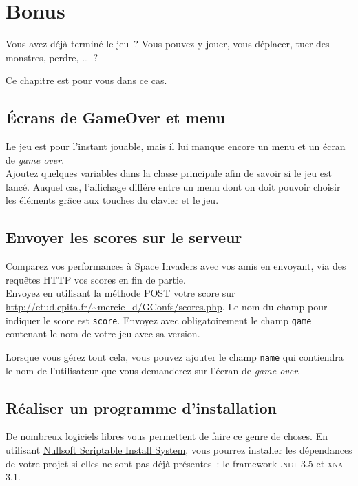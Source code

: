 \chapter{Bonus}

Vous avez déjà terminé le jeu~? Vous pouvez y jouer, vous déplacer, tuer des monstres, perdre, \ldots~?

Ce chapitre est pour vous dans ce cas.

\section{Écrans de GameOver et menu}

Le jeu est pour l'instant jouable, mais il lui manque encore un menu et un écran de \emph{game over}.\\

Ajoutez quelques variables dans la classe principale afin de savoir si le jeu est lancé. Auquel cas, l'affichage différe entre un menu dont on doit pouvoir choisir les éléments grâce aux touches du clavier et le jeu.


\section{Envoyer les scores sur le serveur}

Comparez vos performances à Space Invaders avec vos amis en envoyant, via des requêtes HTTP vos scores en fin de partie.\\

Envoyez en utilisant la méthode POST votre score sur \url{http://etud.epita.fr/~mercie_d/GConfs/scores.php}. Le nom du champ pour indiquer le score est \texttt{score}. Envoyez avec obligatoirement le champ \texttt{game} contenant le nom de votre jeu avec sa version.

Lorsque vous gérez tout cela, vous pouvez ajouter le champ \texttt{name} qui contiendra le nom de l'utilisateur que vous demanderez sur l'écran de \emph{game over}.


\section{Réaliser un programme d'installation}

De nombreux logiciels libres vous permettent de faire ce genre de choses. En utilisant \href{http://nsis.sourceforge.net/}{Nullsoft Scriptable Install System}, vous pourrez installer les dépendances de votre projet si elles ne sont pas déjà présentes~: le framework \textsc{.net} 3.5 et \textsc{xna} 3.1.


